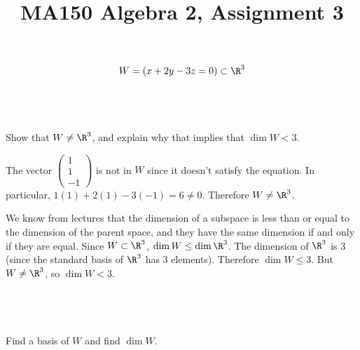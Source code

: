 \documentclass[a4paper]{article}
\title{MA150 Algebra 2, Assignment 3}
\begin{document}
\maketitle

\setlength{\parindent}{0em}
\setlength{\parskip}{1em}


\begin{questionbody}
\begin{equation}
W = (x + 2y - 3z = 0) \subset \R^3
\label{eqn:Q6-W}
\end{equation}
\end{questionbody}

\subsection{~} %

\begin{questionbody}
Show that $W \ne \R^3$, and explain why that implies that $\dim W < 3$.
\end{questionbody}

The vector $\begin{pmatrix}1\\ 1\\ -1\end{pmatrix}$ is not in $W$ since it doesn't satisfy the equation. In particular, $1(1) + 2(1) - 3(-1) = 6 \ne 0$. Therefore $W \ne \R^3$.

We know from lectures that the dimension of a subspace is less than or equal to the dimension of the parent space, and they have the same dimension if and only if they are equal. Since $W \subset \R^3$, $\dim W \le \dim \R^3$. The dimension of $\R^3$ is 3 (since the standard basis of $\R^3$ has 3 elements). Therefore $\dim W \le 3$. But $W \ne \R^3$, so $\dim W < 3$.

\subsection{~} %

\begin{questionbody}
Find a basis of $W$ and find $\dim W$.
\end{questionbody}
\end{document}
